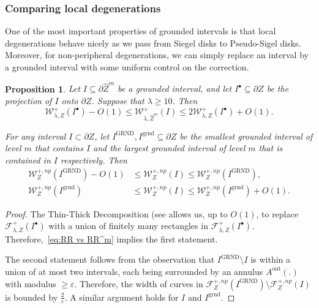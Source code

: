 \documentclass[11pt, reqno]{amsart}
\numberwithin{equation}{section}
\theoremstyle{plain}
\theoremstyle{theorem}
\newtheorem{prop}[theorem]{Proposition}
\theoremstyle{plain}
\theoremstyle{definition}
\numberwithin{figure}{section}
\begin{document}
\subsubsection{Comparing local degenerations}
One of the most important properties of grounded intervals is that local degenerations behave nicely as we pass from Siegel disks to Pseudo-Sigel disks.
Moreover, for non-peripheral degenerations, we can simply replace an interval by a grounded interval with some uniform control on the correction.
\begin{prop}\label{prop:gi}
    Let $I\subseteq \partial \widehat Z^m$ be a grounded interval, and let $I^\bullet \subseteq \partial Z$ be the projection of $I$ onto $\partial Z$.
    Suppose that $\lambda \geq 10$.
    Then
    $$
 \mathcal{W}^+_{\lambda, Z}(I^\bullet) - O(1) \leq \mathcal{W}^+_{\lambda, \widehat Z^m}(I) \leq 2 \mathcal{W}^+_{\lambda, Z}(I^\bullet) + O(1).
    $$
    
For any interval $I\subset \partial Z$,  let $I^{\text{GRND}}, I^{\text{grnd}} \subseteq \partial Z$ be the smallest grounded interval of level $m$ that contains $I$ and the largest grounded interval of level $m$ that is contained in $I$ respectively.
    Then
    \begin{align*}
       \mathcal{W}^{+, np}_{Z}(I^{\text{GRND}}) - O(1) &\leq \mathcal{W}^{+, np}_{Z}(I) \leq \mathcal{W}^{+, np}_{Z}(I^{\text{GRND}}),\\
        \mathcal{W}^{+, np}_{Z}(I^{\text{grnd}}) &\leq \mathcal{W}^{+, np}_{Z}(I) \leq \mathcal{W}^{+, np}_{Z}(I^{\text{grnd}}) + O(1).
    \end{align*}
\end{prop}
\begin{proof}
The Thin-Thick Decomposition (see \cite[Theorem 7.25]{Lyu} allows us, up to $O(1)$, to replace $\mathcal{F}^+_{\lambda,  Z}(I^\bullet)$ with a union of finitely many rectangles in $\mathcal{F}^+_{\lambda,  Z}(I^\bullet)$. Therefore,~\eqref{eq:RR vs RR^m} implies the first statement.
    
    The second statement follows from the observation that $I^{\text{GRND}}\setminus I$ is within a union of at most two intervals, each being surrounded by an annulus $A^\text{out}(.)$ with modulus $\ge \varepsilon$. Therefore, the width of curves in $\mathcal{F}^{+, np}_{Z}(I^{\text{GRND}}) \setminus \mathcal{F}^{+, np}_{Z}(I) $ is bounded by $\frac 2{\varepsilon}$. A similar argument holds for $I$ and $I^\text{grnd}$.
\end{proof}
\end{document}
